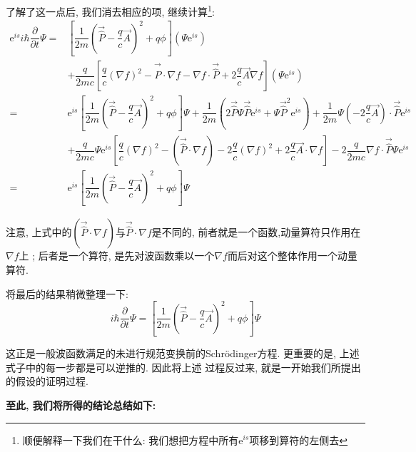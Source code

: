 \documentclass[a4paper, 11pt]{article}
\begin{document}
\begin{spacing}{1.2}
        了解了这一点后, 我们消去相应的项, 继续计算\footnote{顺便解释一下我们在干什么: 我们想把方程中所有$\mathrm{e}^{is}$项移到算符的左侧去}:
        \begin{equation*}
          \begin{aligned}
            \mathrm{e}^{is}i\hbar\dfrac{\partial}{\partial{}t}\Psi
            =&\left[\dfrac{1}{2m}\left(\vec{\hat{P}}-\dfrac{q}{c}\vec{A}\right)^2+q\phi\right]\left(\Psi\mathrm{e}^{is}\right)\\
             &+\dfrac{q}{2mc}\left[\dfrac{q}{c}(\nabla{}f)^2-\vec{\hat{P}}\cdot\nabla{}f-\nabla{}f\cdot\vec{\hat{P}}+2\dfrac{q}{c}\vec{A}\nabla{}f\right]\left(\Psi\mathrm{e}^{is}\right)\\
            =&\mathrm{e}^{is}\left[\dfrac{1}{2m}\left(\vec{\hat{P}}-\dfrac{q}{c}\vec{A}\right)^2+q\phi\right]\Psi+\dfrac{1}{2m}\left(2\vec{\hat{P}}\Psi\vec{\hat{P}}\mathrm{e}^{is}+\Psi\vec{\hat{P}}^2\mathrm{e}^{is}\right)+\dfrac{1}{2m}\Psi\left(-2\dfrac{q}{c}\vec{A}\right)\cdot\vec{\hat{P}}\mathrm{e}^{is}\\
             &+\dfrac{q}{2mc}\Psi\mathrm{e}^{is}\left[\dfrac{q}{c}(\nabla{}f)^2-\left(\vec{\hat{P}}\cdot\nabla{}f\right)-2\dfrac{q}{c}(\nabla{}f)^2+2\dfrac{q}{c}\vec{A}\cdot\nabla{}f\right]-2\dfrac{q}{2mc}\nabla{}f\cdot\vec{\hat{P}}\Psi\mathrm{e}^{is}\\
            =&\mathrm{e}^{is}\left[\dfrac{1}{2m}\left(\vec{\hat{P}}-\dfrac{q}{c}\vec{A}\right)^2+q\phi\right]\Psi
          \end{aligned}
        \end{equation*}

        注意, 上式中的$\left(\vec{\hat{P}}\cdot\nabla{}f\right)$与$\vec{\hat{P}}\cdot\nabla{}f$是不同的, 前者就是一个函数,动量算符只作用在$\nabla{}f$上
        ; 后者是一个算符, 是先对波函数乘以一个$\nabla{}f$而后对这个整体作用一个动量算符.

        将最后的结果稍微整理一下:
        \begin{equation}
          i\hbar\dfrac{\partial}{\partial{}t}\Psi = \left[\dfrac{1}{2m}\left(\vec{\hat{P}}-\dfrac{q}{c}\vec{A}\right)^2+q\phi\right]\Psi
        \end{equation}

        这正是一般波函数满足的未进行规范变换前的Schr\"odinger方程. 更重要的是, 上述式子中的每一步都是可以逆推的. 因此将上述
        过程反过来, 就是一开始我们所提出的假设的证明过程. 

        \textbf{至此, 我们将所得的结论总结如下:}


\end{spacing}
\end{document}
